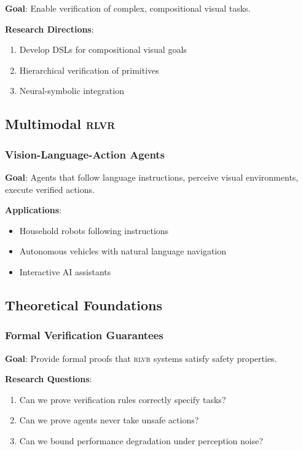 \documentclass[11pt,a4paper]{article}
\newcommand{\rlvr}{\textsc{rlvr}}
\begin{document}
\textbf{Goal}: Enable verification of complex, compositional visual tasks.

\textbf{Research Directions}:
\begin{enumerate}[leftmargin=*]
    \item Develop DSLs for compositional visual goals
    \item Hierarchical verification of primitives
    \item Neural-symbolic integration
\end{enumerate}

\subsection{Multimodal \rlvr{}}
\label{sec:multimodal_future}

\subsubsection{Vision-Language-Action Agents}

\textbf{Goal}: Agents that follow language instructions, perceive visual environments, execute verified actions.

\textbf{Applications}:
\begin{itemize}[leftmargin=*]
    \item Household robots following instructions
    \item Autonomous vehicles with natural language navigation
    \item Interactive AI assistants
\end{itemize}

\subsection{Theoretical Foundations}
\label{sec:theoretical}

\subsubsection{Formal Verification Guarantees}

\textbf{Goal}: Provide formal proofs that \rlvr{} systems satisfy safety properties.

\textbf{Research Questions}:
\begin{enumerate}[leftmargin=*]
    \item Can we prove verification rules correctly specify tasks?
    \item Can we prove agents never take unsafe actions?
    \item Can we bound performance degradation under perception noise?
\end{enumerate}
\end{document}
